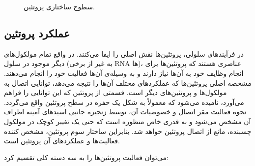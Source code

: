 \begin{figure}[h!]
\caption{
سطوح ساختاری پروتئین.
}
\label{fig:protein}
\end{figure}

\subsection{عملکرد پروتئین}
در فرآیندهای سلولی، پروتئین‌ها نقش اصلی را ایفا می‌کنند. در واقع تمام مولکول‌های دیگر موجود در سلول (به غیر از برخی RNA ها)، عناصری هستند که پروتئین‌ها برای انجام وظایف خود به ‌آن‌ها نیاز دارند و به وسیله‌ی آن‌ها فعالیت خود را انجام می‌دهند. مشخصه اصلی پروتئین‌ها که عملکرد‌های مختلف آن‌ها را نتیجه می‌دهد، توانایی اتصال به مولکول‌ها و پروتئین‌های دیگر است. قسمتی از پروتئین که این توانایی را فراهم می‌آورد،  نامیده می‌شود که معمولاً به شکل یک حفره در سطح پروتئین واقع می‌گردد. نحوه فعالیت مقر اتصال و خصوصیات آن، توسط زنجیره جانبی اسید‌های آمینه اطراف آن مشخص می‌شود و به قدری خاص منظوره است که حتی یک تغییر کوچک در مولکول چسبنده، مانع از اتصال پروتئین خواهد شد. بنابراین ساختار سوم پروتئین، مشخص کننده فعالیت‌ها و عملکرد‌های آن پروتئین است.

می‌توان فعالیت پروتئین‌ها را به سه دسته کلی تقسیم کرد:

